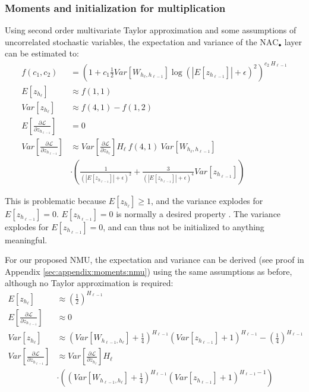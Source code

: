 \subsubsection{Moments and initialization for multiplication}
Using second order multivariate Taylor approximation and some assumptions of uncorrelated stochastic variables, the expectation and variance of the $\mathrm{NAC}_{\bullet}$ layer can be estimated to:
\begin{equation}
\begin{aligned}
f(c_1, c_2) &= \left(1 + c_1 \frac{1}{2} Var[W_{h_\ell, h_{\ell-1}}] \log(|E[z_{h_{\ell-1}}]| + \epsilon)^2\right)^{c_2\ H_{\ell-1}} \\
E[z_{h_\ell}] &\approx f\left(1, 1\right) \\
Var[z_{h_\ell}] &\approx f\left(4, 1\right) - f\left(1, 2\right) \\
E\left[\frac{\partial \mathcal{L}}{\partial z_{h_{\ell-1}}}\right] &= 0 \\
Var\left[\frac{\partial \mathcal{L}}{\partial z_{h_{\ell-1}}}\right] &\approx Var\left[\frac{\partial \mathcal{L}}{\partial z_{h_{\ell}}}\right] H_{\ell}\ f\left(4, 1\right)\ Var[W_{h_{\ell}, h_{\ell-1}}] \\
&\cdot \left(\frac{1}{\left(|E[z_{h_{\ell-1}}]| + \epsilon\right)^2} + \frac{3}{\left(|E[z_{h_{\ell-1}}]| + \epsilon\right)^4} Var[z_{h_{\ell-1}}]\right)
\end{aligned}
\end{equation}

This is problematic because $E[z_{h_\ell}] \ge 1$, and the variance explodes for $E[z_{h_{\ell-1}}] = 0$. $E[z_{h_{\ell-1}}] = 0$ is normally a desired property \cite{glorot-initialization}. The variance explodes for $E[z_{h_{\ell-1}}] = 0$, and can thus not be initialized to anything meaningful.

For our proposed NMU, the expectation and variance can be derived (see proof in Appendix \ref{sec:appendix:moments:nmu}) using the same assumptions as before, although no Taylor approximation is required:
\begin{equation}
\begin{aligned}
E[z_{h_\ell}] &\approx \left(\frac{1}{2}\right)^{H_{\ell-1}} \\
E\left[\frac{\partial \mathcal{L}}{\partial z_{h_{\ell-1}}}\right] &\approx 0 \\
Var[z_{h_\ell}] &\approx \left(Var[W_{h_{\ell-1},h_\ell}] + \frac{1}{4}\right)^{H_{\ell-1}} \left(Var[z_{h_{\ell-1}}] + 1\right)^{H_{\ell-1}} - \left(\frac{1}{4}\right)^{H_{\ell-1}} \\
Var\left[\frac{\partial \mathcal{L}}{\partial z_{h_{\ell-1}}}\right] &\approx Var\left[\frac{\partial \mathcal{L}}{\partial z_{h_\ell}}\right] H_\ell \\
&\cdot \left(
\left(Var[W_{h_{\ell-1},h_\ell}] + \frac{1}{4}\right)^{H_{\ell-1}} \left(Var[z_{h_{\ell-1}}] + 1\right)^{H_{\ell-1} - 1}\right)
\end{aligned}
\end{equation}

